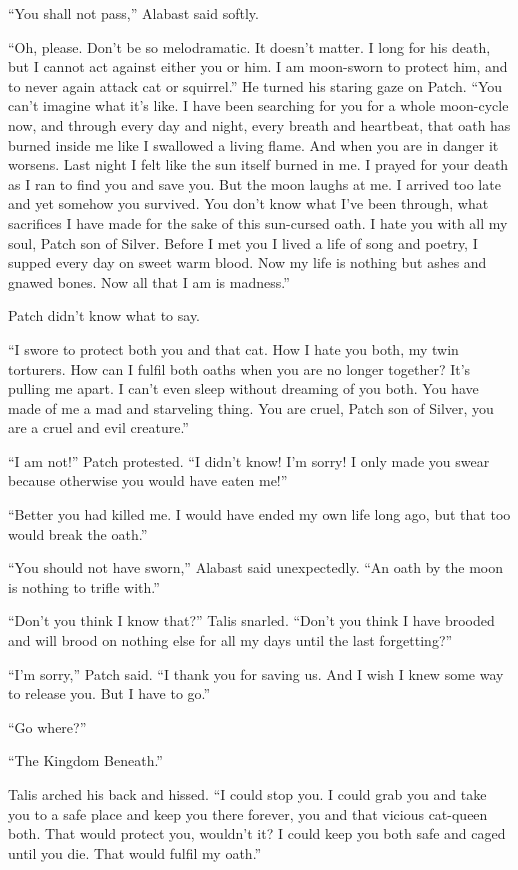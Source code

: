 \documentclass[12pt]{memoir}
\begin{document}
“You shall not pass,” Alabast said softly.

“Oh, please. Don’t be so melodramatic. It doesn’t matter. I long for
his death, but I cannot act against either you or him. I am moon-sworn
to protect him, and to never again attack cat or squirrel.” He turned
his staring gaze on Patch. “You can’t imagine what it’s like. I have
been searching for you for a whole moon-cycle now, and through every
day and night, every breath and heartbeat, that oath has burned inside
me like I swallowed a living flame. And when you are in danger it
worsens. Last night I felt like the sun itself burned in me. I prayed
for your death as I ran to find you and save you. But the moon laughs
at me. I arrived too late and yet somehow you survived. You don’t know
what I’ve been through, what sacrifices I have made for the sake of
this sun-cursed oath. I hate you with all my soul, Patch son of
Silver. Before I met you I lived a life of song and poetry, I supped
every day on sweet warm blood. Now my life is nothing but ashes and
gnawed bones. Now all that I am is madness.”

Patch didn’t know what to say.

“I swore to protect both you and that cat. How I hate you both, my
twin torturers. How can I fulfil both oaths when you are no longer
together? It’s pulling me apart. I can’t even sleep without dreaming
of you both. You have made of me a mad and starveling thing. You are
cruel, Patch son of Silver, you are a cruel and evil creature.”

“I am not!” Patch protested. “I didn’t know! I’m sorry! I only made
you swear because otherwise you would have eaten me!”

“Better you had killed me. I would have ended my own life long ago,
but that too would break the oath.”

“You should not have sworn,” Alabast said unexpectedly. “An oath by
the moon is nothing to trifle with.”

“Don’t you think I know that?” Talis snarled. “Don’t you think I have
brooded and will brood on nothing else for all my days until the last
forgetting?”

“I’m sorry,” Patch said. “I thank you for saving us. And I wish I knew
some way to release you. But I have to go.”

“Go where?”

“The Kingdom Beneath.”

Talis arched his back and hissed. “I could stop you. I could grab you
and take you to a safe place and keep you there forever, you and that
vicious cat-queen both. That would protect you, wouldn’t it? I could
keep you both safe and caged until you die. That would fulfil my
oath.”
\end{document}
